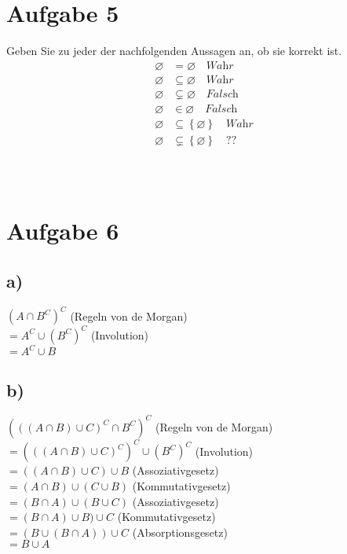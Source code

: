 \documentclass[11pt]{article}
\begin{document}
		
\section*{Aufgabe 5}
	 Geben Sie zu jeder der nachfolgenden Aussagen an, ob sie korrekt ist.
		\begin{align*}
			\varnothing &= \varnothing \quad \textit{Wahr}\\
			\varnothing &\subseteq \varnothing \quad \textit{Wahr}\\
			\varnothing &\subsetneq \varnothing \quad \textit{Falsch}\\
			\varnothing &\in \varnothing \quad \textit{Falsch}\\
			\varnothing &\subseteq \left\{\varnothing\right\} \quad \textit{Wahr}\\
			\varnothing &\subsetneq \left\{\varnothing\right\} \quad \textit{??}\\
		\end{align*}\\\\

\section*{Aufgabe 6}

\subsection*{a)}
$(A \cap B^C)^C$ (Regeln von de Morgan)\\
$= A^C \cup (B^C)^C$ (Involution)\\
$= A^C \cup B$\\

\subsection*{b)}
$(((A\cap B) \cup C)^C \cap B^C)^C$ (Regeln von de Morgan)\\
$= (((A\cap B)\cup C)^C)^C \cup (B^C)^C$ (Involution)\\
$= ((A\cap B)\cup C) \cup B$ (Assoziativgesetz)\\
$= (A\cap B) \cup (C \cup B)$ (Kommutativgesetz)\\
$= (B\cap A) \cup (B \cup C) $ (Assoziativgesetz)\\
$= (B\cap A)\cup B) \cup C$  (Kommutativgesetz)\\
$= (B\cup (B\cap A))\cup C$ (Absorptionsgesetz)\\
$= B \cup A$



\pagebreak
\end{document}
